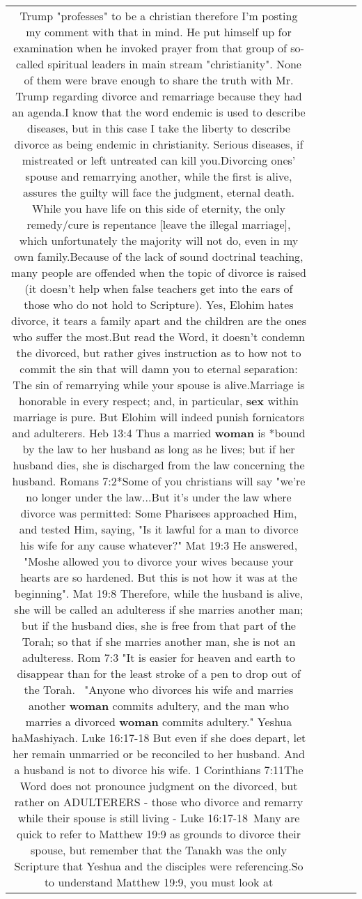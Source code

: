 \documentclass[11pt]{article}
\newlength\mylength
\begin{document}
\begin{center}
\begin{longtable}{|C{.65\mylength}|C{.30\mylength}|C{.12\mylength}|C{.12\mylength}|C{.12\mylength}|}
  \small Trump "professes" to be a christian therefore I'm posting my comment with that in mind. He put himself up for examination when he invoked prayer from that group of so-called spiritual leaders in main stream "christianity". None of them were brave enough to share the truth with Mr. Trump regarding divorce and remarriage because they had an agenda.I know that the word endemic is used to describe diseases, but in this case I take the liberty to describe divorce as being endemic in christianity. Serious diseases, if  mistreated or left untreated can kill you.Divorcing ones' spouse and remarrying another, while the first is alive, assures the guilty will face the judgment, eternal death. While you have life on this side of eternity, the only remedy/cure is repentance [leave the illegal marriage], which unfortunately the majority will not do, even in my own family.Because of the lack of sound doctrinal teaching, many people are offended when the topic of divorce is raised (it doesn't help when false teachers get into the ears of those who do not hold to Scripture). Yes, Elohim hates divorce, it tears a family apart and the children are the ones who suffer the most.But read the Word, it doesn't condemn the divorced, but rather gives instruction as to how not to commit the sin that will damn you to eternal separation: The sin of remarrying while your spouse  is alive.Marriage is honorable in every respect; and, in particular, \textbf{sex} within marriage is pure. But Elohim will indeed punish fornicators and adulterers. Heb 13:4  Thus a married \textbf{woman} is *bound by the law to her husband as long as he lives; but if her husband dies, she is discharged from the law concerning the husband. Romans 7:2*Some of you christians will say "we're no longer under the law...But it's under the law where divorce was permitted: Some Pharisees approached Him, and tested Him, saying, "Is it lawful for a man to divorce his wife for any cause whatever?" Mat 19:3 He answered, "Moshe allowed you to divorce your wives because your hearts are so hardened. But this is not how it was at the beginning". Mat 19:8   Therefore, while the husband is alive, she will be called an adulteress if she marries another man; but if the husband dies, she is free from that part of the Torah; so that if she marries another man, she is not an adulteress. Rom 7:3  "It is easier for heaven and earth to disappear than for the least stroke of a pen to drop out of the Torah.  "Anyone who divorces his wife and marries another \textbf{woman} commits adultery, and the man who marries a divorced \textbf{woman} commits adultery." Yeshua haMashiyach. Luke 16:17-18 But even if she does depart, let her remain unmarried or be reconciled to her husband. And a husband is not to divorce his wife. 1 Corinthians 7:11The Word does not pronounce judgment on the divorced, but rather on ADULTERERS - those who divorce and remarry while their spouse is still living - Luke 16:17-18 Many are quick to refer to Matthew 19:9 as grounds to divorce their spouse, but remember that the Tanakh was the only Scripture that Yeshua and the disciples were referencing.So to understand Matthew 19:9, you must look at 
\end{longtable}
\end{center}
\end{document}
